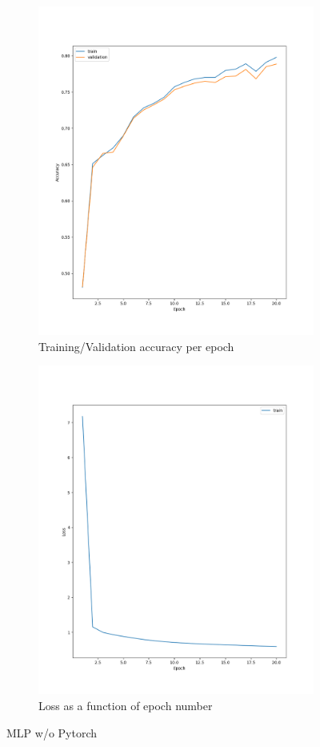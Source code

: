 \documentclass[11pt]{article}
\begin{document}
\begin{figure}[h!]
\centering
\begin{subfigure}{.5\textwidth}
  \centering
  \includegraphics[width=.9\linewidth]{./plots/mlp_acc_per_epoch.png}
  \caption{Training/Validation accuracy per epoch}
\end{subfigure}%
\begin{subfigure}{.5\textwidth}
  \centering
  \includegraphics[width=.9\linewidth]{./plots/mlp_loss_per_epoch.png}
  \caption{Loss as a function of epoch number}
\end{subfigure}
\caption{MLP w/o Pytorch}
\label{fig:mlp2b}
\end{figure}
\end{document}
